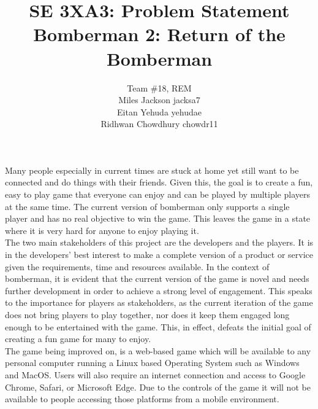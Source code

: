 \documentclass{article}
\title{SE 3XA3: Problem Statement\\ Bomberman 2: Return of the Bomberman}
\author{Team \#18, REM
		\\ Miles Jackson  jacksa7
		\\ Eitan Yehuda  yehudae
		\\ Ridhwan Chowdhury chowdr11
}
\date{}
\begin{document}

\maketitle

Many people especially in current times are stuck at home yet still want to be connected and do things with their friends. Given this, the goal is to create a fun, easy to play game that everyone can enjoy and can be played by multiple players at the same time. The current version of bomberman only supports a single player and has no real objective to win the game. This leaves the game in a state where it is very hard for anyone to enjoy playing it. \\
 
The two main stakeholders of this project are the developers and the players. It is in the developers’ best interest to make a complete version of a product or service given the requirements, time and resources available. In the context of bomberman, it is evident that the current version of the game is novel and needs further development in order to achieve a strong level of engagement. This speaks to the importance for players as stakeholders, as the current iteration of the game does not bring players to play together, nor does it keep them engaged long enough to be entertained with the game. This, in effect, defeats the initial goal of creating a fun game for many to enjoy. \\
 
The game being improved on, is a web-based game which will be available to any personal computer running a Linux based Operating System such as Windows and MacOS. Users will also require an internet connection and access to Google Chrome, Safari, or Microsoft Edge. Due to the controls of the game it will not be available to people accessing those platforms from a mobile environment. \\
\end{document}
